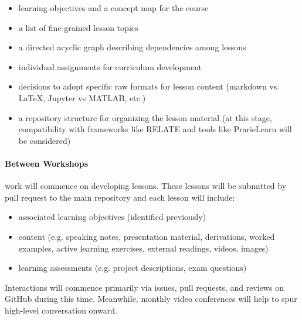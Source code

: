 \documentclass[11pt]{article}
\begin{document}
          \begin{itemize} 
                  \item learning objectives\cite{bloom_bloom_1984} and a concept 
                          map\cite{novak_concept_1990} for the course
                  \item a list of fine-grained lesson topics
                  \item a directed acyclic graph describing dependencies among 
                          lessons
                  \item individual assignments for curriculum development
                  \item decisions to adopt specific raw formats for lesson content
                        (markdown vs. \LaTeX, Jupyter vs MATLAB, etc.)
                  \item a repository structure for organizing the lesson 
                          material (at this stage, compatibility with 
                          frameworks like RELATE 
                          \cite{kloeckner_relate_2017,kloeckner_relate_2017} 
                          and tools like PrarieLearn 
                          \cite{west_prairielearn:_2015} will be considered)
          \end{itemize} 

          \paragraph{Between Workshops} work will commence on developing 
          lessons. These lessons will be submitted by pull request to the main 
          repository and each lesson will include:
          \begin{itemize} 
                  \item associated learning objectives (identified previously)
                \item content (e.g. speaking notes, presentation material, 
                        derivations, worked examples, active learning  
                          exercises, external readings, videos, images)
                  \item learning assessments (e.g. project descriptions, exam questions) 
          \end{itemize} 

          Interactions will commence primarily via issues, pull requests, and 
          reviews on GitHub during this time. Meanwhile, monthly video 
          conferences will help to spur high-level conversation onward.
\end{document}
